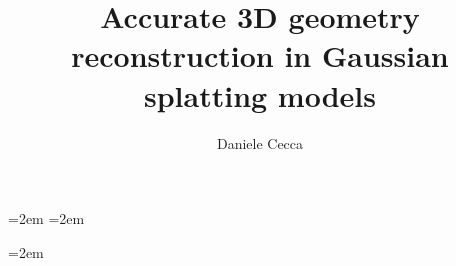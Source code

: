 \documentclass{styles/tthesis}
\title{Accurate 3D geometry reconstruction in Gaussian splatting models}
\author{Daniele Cecca}
\begin{document}
\printfrontpage

\begingroup
\emergencystretch=2em
\sloppy
\tableofcontents
\endgroup
\begingroup
\emergencystretch=2em
\sloppy
\listoffigures
\listoftables
\endgroup

\mainmatter
\emergencystretch=2em
\sloppy








\label{Bibliography}


\end{document}
